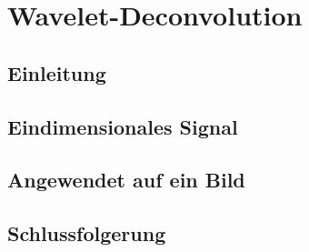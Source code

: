 %
%
%
\chapter{Wavelet-Deconvolution\label{chapter:deconvolve}}
\begin{refsection}

\section{Einleitung}


\section{Eindimensionales Signal}


\section{Angewendet auf ein Bild}


\section{Schlussfolgerung}


\end{refsection}
